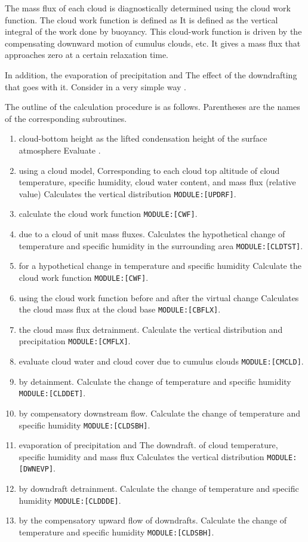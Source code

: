 The mass flux of each cloud is diagnostically determined using the cloud
work function. The cloud work function is defined as It is defined as
the vertical integral of the work done by buoyancy. This cloud-work
function is driven by the compensating downward motion of cumulus
clouds, etc. It gives a mass flux that approaches zero at a certain
relaxation time.

In addition, the evaporation of precipitation and The effect of the
downdrafting that goes with it. Consider in a very simple way .

The outline of the calculation procedure is as follows. Parentheses are
the names of the corresponding subroutines.

\begin{enumerate}
\def\labelenumi{\arabic{enumi}.}
\item
  cloud-bottom height as the lifted condensation height of the surface
  atmosphere Evaluate .
\item
  using a cloud model, Corresponding to each cloud top altitude of cloud
  temperature, specific humidity, cloud water content, and mass flux
  (relative value) Calculates the vertical distribution
  \texttt{MODULE:{[}UPDRF{]}}.
\item
  calculate the cloud work function \texttt{MODULE:{[}CWF{]}}.
\item
  due to a cloud of unit mass fluxes. Calculates the hypothetical change
  of temperature and specific humidity in the surrounding area
  \texttt{MODULE:{[}CLDTST{]}}.
\item
  for a hypothetical change in temperature and specific humidity
  Calculate the cloud work function \texttt{MODULE:{[}CWF{]}}.
\item
  using the cloud work function before and after the virtual change
  Calculates the cloud mass flux at the cloud base
  \texttt{MODULE:{[}CBFLX{]}}.
\item
  the cloud mass flux detrainment. Calculate the vertical distribution
  and precipitation \texttt{MODULE:{[}CMFLX{]}}.
\item
  evaluate cloud water and cloud cover due to cumulus clouds
  \texttt{MODULE:{[}CMCLD{]}}.
\item
  by detainment. Calculate the change of temperature and specific
  humidity \texttt{MODULE:{[}CLDDET{]}}.
\item
  by compensatory downstream flow. Calculate the change of temperature
  and specific humidity \texttt{MODULE:{[}CLDSBH{]}}.
\item
  evaporation of precipitation and The downdraft. of cloud temperature,
  specific humidity and mass flux Calculates the vertical distribution
  \texttt{MODULE:{[}DWNEVP{]}}.
\item
  by downdraft detrainment. Calculate the change of temperature and
  specific humidity \texttt{MODULE:{[}CLDDDE{]}}.
\item
  by the compensatory upward flow of downdrafts. Calculate the change of
  temperature and specific humidity \texttt{MODULE:{[}CLDSBH{]}}.
\end{enumerate}

